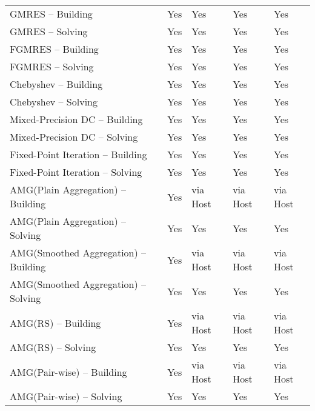 \begin{table}[H]
\begin{tabular}{l|l|l|l|l}
GMRES -- Building   & Yes    & Yes   & Yes     & \multicolumn{1}{l|}{Yes} \\
GMRES -- Solving    & Yes    & Yes   & Yes     & \multicolumn{1}{l|}{Yes} \\ \hline

FGMRES -- Building   & Yes    & Yes   & Yes     & \multicolumn{1}{l|}{Yes} \\
FGMRES -- Solving    & Yes    & Yes   & Yes     & \multicolumn{1}{l|}{Yes} \\ \hline

Chebyshev -- Building   & Yes    & Yes   & Yes     & \multicolumn{1}{l|}{Yes} \\
Chebyshev -- Solving    & Yes    & Yes   & Yes     & \multicolumn{1}{l|}{Yes} \\ \hline

Mixed-Precision DC -- Building   & Yes    & Yes   & Yes     & \multicolumn{1}{l|}{Yes} \\
Mixed-Precision DC -- Solving    & Yes    & Yes   & Yes     & \multicolumn{1}{l|}{Yes} \\ \hline

Fixed-Point Iteration -- Building   & Yes    & Yes   & Yes     & \multicolumn{1}{l|}{Yes} \\
Fixed-Point Iteration -- Solving    & Yes    & Yes   & Yes     & \multicolumn{1}{l|}{Yes} \\ \hline

AMG(Plain Aggregation) -- Building   & Yes    & via Host   & via Host     & \multicolumn{1}{l|}{via Host} \\
AMG(Plain Aggregation) -- Solving    & Yes    & Yes   & Yes     & \multicolumn{1}{l|}{Yes} \\ \hline

AMG(Smoothed Aggregation) -- Building   & Yes    & via Host   & via Host     & \multicolumn{1}{l|}{via Host} \\
AMG(Smoothed Aggregation) -- Solving    & Yes    & Yes   & Yes     & \multicolumn{1}{l|}{Yes} \\ \hline

AMG(RS) -- Building   & Yes    & via Host   & via Host     & \multicolumn{1}{l|}{via Host} \\
AMG(RS) -- Solving    & Yes    & Yes   & Yes     & \multicolumn{1}{l|}{Yes} \\ \hline

AMG(Pair-wise) -- Building   & Yes    & via Host   & via Host     & \multicolumn{1}{l|}{via Host} \\
AMG(Pair-wise) -- Solving    & Yes    & Yes   & Yes     & \multicolumn{1}{l|}{Yes} \\ \hline


\end{tabular}
\end{table}
